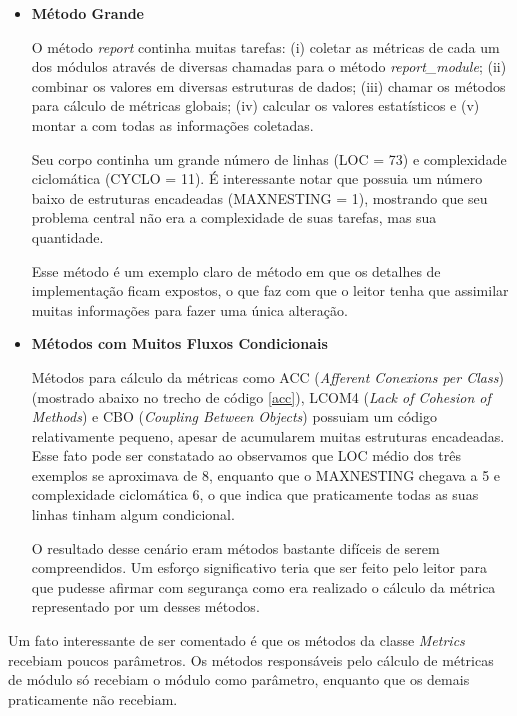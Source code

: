 \begin{itemize}
\item 
\textbf{Método Grande}

O método \textit{report} continha muitas tarefas: (i) coletar as métricas de cada um dos módulos
através de diversas chamadas para o método \textit{report\_module}; (ii) combinar os valores em 
diversas estruturas de dados; (iii) chamar os métodos para cálculo de métricas globais; (iv)
calcular os valores estatísticos e (v) montar a com todas as informações coletadas.

Seu corpo continha um grande número de linhas (LOC = 73) e complexidade ciclomática (CYCLO = 11).
É interessante notar que possuia um número baixo de estruturas encadeadas (MAXNESTING = 1), mostrando
que seu problema central não era a complexidade de suas tarefas, mas sua quantidade.

Esse método é um exemplo claro de método em que os detalhes de implementação ficam expostos, o que 
faz com que o leitor tenha que assimilar muitas informações para fazer uma única alteração.

\item
\textbf{Métodos com Muitos Fluxos Condicionais}

Métodos para cálculo da métricas como ACC (\textit{Afferent Conexions per Class}) (mostrado abaixo
no trecho de código \ref{acc}), LCOM4 (\textit{Lack of Cohesion of Methods}) e CBO
(\textit{Coupling Between Objects}) possuiam um código relativamente pequeno, apesar de acumularem muitas 
estruturas encadeadas. Esse fato pode ser constatado ao observamos que LOC médio dos três exemplos se 
aproximava de 8, enquanto que o MAXNESTING chegava a 5 e complexidade ciclomática 6, o que indica que
praticamente todas as suas linhas tinham algum condicional.

O resultado desse cenário eram métodos bastante difíceis de serem compreendidos. 
Um esforço significativo teria que ser feito pelo leitor para que  pudesse afirmar
com segurança como era realizado o cálculo da métrica representado por um desses
métodos.



\end{itemize}

Um fato interessante de ser comentado é que os métodos da classe \textit{Metrics}
recebiam poucos parâmetros. Os métodos responsáveis pelo cálculo de métricas de módulo
só recebiam o módulo como parâmetro, enquanto que os demais praticamente não recebiam.

